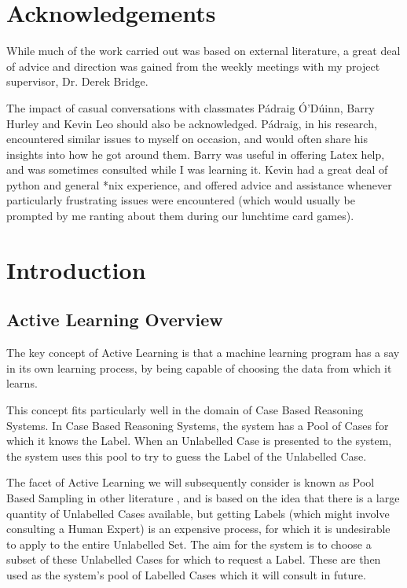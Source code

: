 \documentclass[a4paper,11pt]{report}
\begin{document}
\chapter*{Acknowledgements}
While much of the work carried out was based on external literature, a great deal of advice and direction was gained from the weekly meetings with my project supervisor, Dr. Derek Bridge.

The impact of casual conversations with classmates P\'{a}draig \'{O}'D\'{u}inn, Barry Hurley and Kevin Leo should also be acknowledged. P\'{a}draig, in his research, encountered similar issues to myself on occasion, and would often share his insights into how he got around them. Barry was useful in offering Latex help, and was sometimes consulted while I was learning it. Kevin had a great deal of python and general *nix experience, and offered advice and assistance whenever particularly frustrating issues were encountered (which would usually be prompted by me ranting about them during our lunchtime card games).

\tableofcontents

\chapter{Introduction}
\section{Active Learning Overview}
The key concept of Active Learning is that a machine learning program has a say in its own learning process, by being capable of choosing the data from which it learns. 

This concept fits particularly well in the domain of Case Based Reasoning Systems. In Case Based Reasoning Systems, the system has a Pool of Cases for which it knows the Label. When an Unlabelled Case is presented to the system, the system uses this pool to try to guess the Label of the Unlabelled Case.

The facet of Active Learning we will subsequently consider is known as Pool Based Sampling in other literature \cite{Settles2010}, and is based on the idea that there is a large quantity of Unlabelled Cases available, but getting Labels (which might involve consulting a Human Expert) is an expensive process, for which it is undesirable to apply to the entire Unlabelled Set. The aim for the system is to choose a subset of these Unlabelled Cases for which to request a Label. These are then used as the system's pool of Labelled Cases which it will consult in future.
\end{document}
